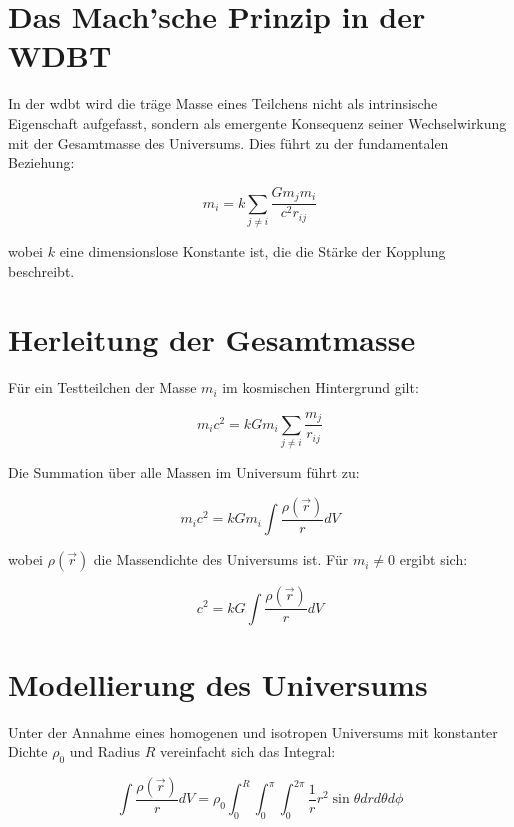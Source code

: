\section{Das Mach'sche Prinzip in der WDBT}
In der \gls{wdbt} wird die träge Masse eines Teilchens nicht als intrinsische Eigenschaft aufgefasst, sondern als emergente Konsequenz seiner Wechselwirkung mit der Gesamtmasse des Universums. Dies führt
zu der fundamentalen Beziehung:

\begin{equation}
    m_i = k \sum_{j \neq i} \frac{G m_j m_i}{c^2 r_{ij}}
\end{equation}

wobei $k$ eine dimensionslose Konstante ist, die die Stärke der Kopplung beschreibt.

\section{Herleitung der Gesamtmasse}
Für ein Testteilchen der Masse $m_i$ im kosmischen Hintergrund gilt:

\begin{equation}
    m_i c^2 = k G m_i \sum_{j \neq i} \frac{m_j}{r_{ij}}
\end{equation}

Die Summation über alle Massen im Universum führt zu:

\begin{equation}
    m_i c^2 = k G m_i \int \frac{\rho(\vec{r})}{r}  dV
\end{equation}

wobei $\rho(\vec{r})$ die Massendichte des Universums ist. Für $m_i \ne 0$ ergibt sich:

\begin{equation}
    c^2 = k G \int \frac{\rho(\vec{r})}{r}  dV
\end{equation}

\section{Modellierung des Universums}
Unter der Annahme eines homogenen und isotropen Universums mit konstanter Dichte $\rho_0$ und Radius $R$ vereinfacht sich das Integral:

\begin{equation}
    \int \frac{\rho(\vec{r})}{r}  dV = \rho_0 \int_0^R \int_0^\pi \int_0^{2\pi} \frac{1}{r} r^2 \sin\theta  dr d\theta d\phi
\end{equation}

